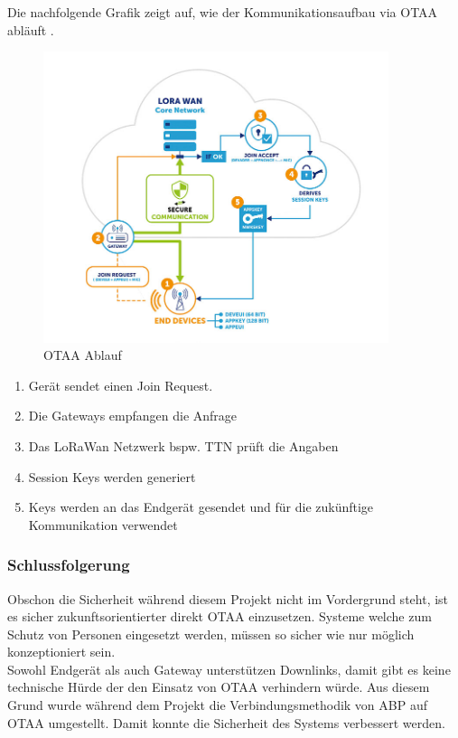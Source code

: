 \documentclass[11pt,english,german]{report}
\theoremstyle{definition}
\begin{document}
\newpage
\noindent
Die nachfolgende Grafik zeigt auf, wie der Kommunikationsaufbau via OTAA abläuft \cite{jaguar}.
\begin{figure}[H]
	\centering
	\includegraphics[width=0.9\textwidth]{img/lora/otaa_schema.jpg}
	\caption[OTAA Ablauf]
	{OTAA Ablauf}
\end{figure}

\begin{enumerate}
	\item Gerät sendet einen Join Request.
	\item Die Gateways empfangen die Anfrage
	\item Das LoRaWan Netzwerk  bspw. TTN prüft die Angaben
	\item Session Keys werden generiert
	\item Keys werden an das Endgerät gesendet und für die zukünftige Kommunikation verwendet
\end{enumerate}

\newpage
\subsubsection{Schlussfolgerung}
Obschon die Sicherheit während diesem Projekt nicht im Vordergrund steht, ist es sicher zukunftsorientierter direkt OTAA einzusetzen. Systeme welche zum Schutz von Personen eingesetzt werden, müssen so sicher wie nur möglich konzeptioniert sein.\\[0.3cm]
Sowohl Endgerät als auch Gateway unterstützen Downlinks, damit gibt es keine technische Hürde der den Einsatz von OTAA verhindern würde. Aus diesem Grund wurde während dem Projekt die Verbindungsmethodik von ABP auf OTAA umgestellt. Damit konnte die Sicherheit des Systems verbessert werden.
\end{document}
